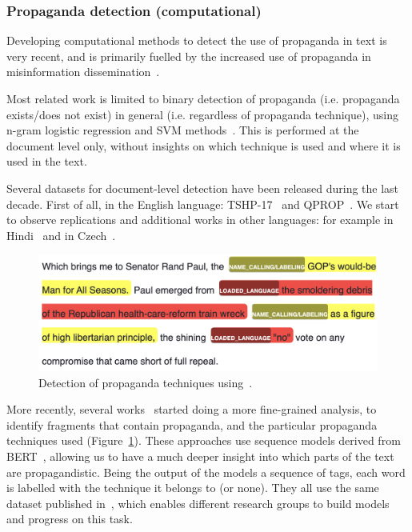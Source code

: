 \subsubsection{Propaganda detection (computational)}
\label{ssec:lit_propaganda_detection}

Developing computational methods to detect the use of propaganda in text is very recent, and is primarily fuelled by the increased use of propaganda in misinformation dissemination~\citep{da2020survey}.

Most related work is limited to binary detection of propaganda (i.e. propaganda exists/does not exist) in general (i.e. regardless of propaganda technique), using n-gram logistic regression and SVM methods~\citep{rashkin2017truth,barron2019proppy}. This is performed at the document level only, without insights on which technique is used and where it is used in the text.


Several datasets for document-level detection have been released during the last decade.
First of all, in the English language:
TSHP-17~\citep{rashkin2017truth} and
QPROP~\citep{alberto_barron_cedeno_2019_3271522}.
We start to observe replications and additional works in other languages: for example in Hindi~\citep{chaudhari2022h,chaudhari_deptii_2022_5828240}
and in Czech~\citep{baisa2019benchmark}.

\begin{figure}[!htb]
    \centering
    \includegraphics[width=\linewidth]{figures/propaganda_example_1_color.png}
    \caption{Detection of propaganda techniques using~\citet{baly2020we}.%
    }
    \label{fig:propaganda_example_1}
\end{figure}

More recently, several works~\citep{da2019fine,yoosuf2019fine,vorakitphan2022protect} started doing a more fine-grained analysis, to identify fragments that contain propaganda, and the particular propaganda techniques used (Figure~\ref{fig:propaganda_example_1}).
These approaches use sequence models derived from BERT~\citep{devlin2018bert}, allowing us to have a much deeper insight into which parts of the text are propagandistic. Being the output of the models a sequence of tags, each word is labelled with the technique it belongs to (or none).
They all use the same dataset published in~\citet{da2019fine}, which enables different research groups to build models and progress on this task.


